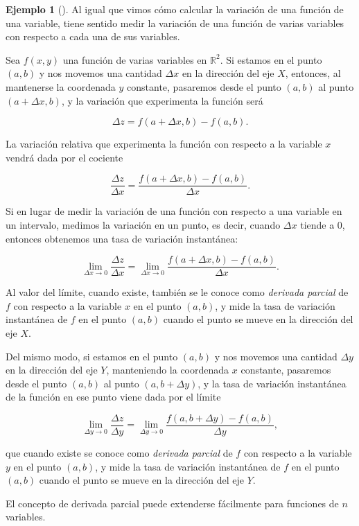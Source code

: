 \documentclass[
  a4paper,
]{scrreport}
\theoremstyle{definition}
\newtheorem{example}{Ejemplo}[chapter]
\theoremstyle{plain}
\theoremstyle{definition}
\theoremstyle{definition}
\theoremstyle{plain}
\theoremstyle{plain}
\theoremstyle{remark}
\begin{document}
\begin{example}[]
Al igual que vimos cómo calcular la variación de una función de una
variable, tiene sentido medir la variación de una función de varias
variables con respecto a cada una de sus variables.

Sea \(f(x,y)\) una función de varias variables en \(\mathbb{R}^2\). Si
estamos en el punto \((a,b)\) y nos movemos una cantidad \(\Delta x\) en
la dirección del eje \(X\), entonces, al mantenerse la coordenada \(y\)
constante, pasaremos desde el punto \((a,b)\) al punto
\((a+\Delta x,b)\), y la variación que experimenta la función será

\[
\Delta z=f(a+\Delta x,b)-f(a,b).
\]

La variación relativa que experimenta la función con respecto a la
variable \(x\) vendrá dada por el cociente

\[
\frac{\Delta z}{\Delta x}=\frac{f(a+\Delta x,b)-f(a,b)}{\Delta x}.
\]

Si en lugar de medir la variación de una función con respecto a una
variable en un intervalo, medimos la variación en un punto, es decir,
cuando \(\Delta x\) tiende a 0, entonces obtenemos una tasa de variación
instantánea:

\[
\lim_{\Delta x\rightarrow 0}\frac{\Delta z}{\Delta x}=\lim_{\Delta x \rightarrow 0}\frac{f(a+\Delta x,b)-f(a,b)}{\Delta x}.
\]

Al valor del límite, cuando existe, también se le conoce como
\emph{derivada parcial} de \(f\) con respecto a la variable \(x\) en el
punto \((a,b)\), y mide la tasa de variación instantánea de \(f\) en el
punto \((a,b)\) cuando el punto se mueve en la dirección del eje \(X\).

Del mismo modo, si estamos en el punto \((a,b)\) y nos movemos una
cantidad \(\Delta y\) en la dirección del eje \(Y\), manteniendo la
coordenada \(x\) constante, pasaremos desde el punto \((a,b)\) al punto
\((a,b+\Delta y)\), y la tasa de variación instantánea de la función en
ese punto viene dada por el límite

\[
\lim_{\Delta y\rightarrow 0}\frac{\Delta z}{\Delta y}=\lim_{\Delta y \rightarrow 0}\frac{f(a,b+\Delta y)-f(a,b)}{\Delta y},
\]

que cuando existe se conoce como \emph{derivada parcial} de \(f\) con
respecto a la variable \(y\) en el punto \((a,b)\), y mide la tasa de
variación instantánea de \(f\) en el punto \((a,b)\) cuando el punto se
mueve en la dirección del eje \(Y\).

El concepto de derivada parcial puede extenderse fácilmente para
funciones de \(n\) variables.


\end{example}
\end{document}
